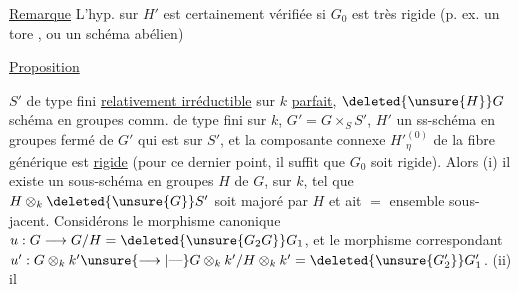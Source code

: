 \uline{Remarque} L'hyp. sur $H'$ est certainement
vérifiée si $G_0$ est  très rigide
(p. ex. un tore , ou un schéma
abélien)


\uline{Proposition}

\margin{\rule[-13\baselineskip]{0.35pt}{13\baselineskip}}$S'$ de type fini  \uline{relativement irréductible}
 sur $k$  \uline{parfait}, $\deleted{\unsure{H}}G$ schéma en groupes
comm. de type fini sur $k$, $G'=G\times_S S'$,
$H'$ un ss-schéma en groupes fermé
de $G'$ qui est   sur $S'$, et 
la composante connexe ${H'}^{(0)}_{\eta}$ de la fibre
générique est \uline{rigide} (pour ce dernier
point, il suffit que $G_0$ soit  rigide).
Alors (i) il existe un sous-schéma en
groupes $H$ de $G$,  sur $k$, tel que
$H\otimes_k \deleted{\unsure{G}}S'$ soit majoré par $H$ et ait $=$
ensemble sous-jacent. 
  Considérons  le morphisme
canonique $u:G\longrightarrow G/H=\deleted{\unsure{G_2 G}}G_1$, et le
morphisme correspondant 
$u':G\otimes_k k'\unsure{\longrightarrow|\text{---}}G\otimes_k k'/H\otimes_k k'=\deleted{\unsure{G'_2}}G'_1$. (ii)  il
